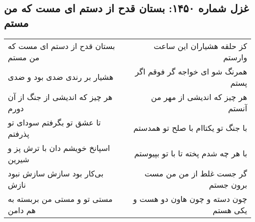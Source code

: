 \begin{center}
\section*{غزل شماره ۱۴۵۰: بستان قدح از دستم ای مست که من مستم}
\label{sec:1450}
\begin{longtable}{l p{0.5cm} r}
بستان قدح از دستم ای مست که من مستم
&&
کز حلقه هشیاران این ساعت وارستم
\\
هشیار بر رندی ضدی بود و ضدی
&&
همرنگ شو ای خواجه گر فوقم اگر پستم
\\
هر چیز که اندیشی از جنگ از آن دورم
&&
هر چیز که اندیشی از مهر من آنستم
\\
تا عشق تو بگرفتم سودای تو پذرفتم
&&
با جنگ تو یکتاام با صلح تو همدستم
\\
اسپانخ خویشم دان با ترش پز و شیرین
&&
با هر چه شدم پخته تا با تو بپیوستم
\\
بی‌کار بود سازش سازش نبود نازش
&&
گر جست غلط از من من مست برون جستم
\\
مستی تو و مستی من بربسته به هم دامن
&&
چون دسته و چون هاون دو هست و یکی هستم
\\
\end{longtable}
\end{center}
